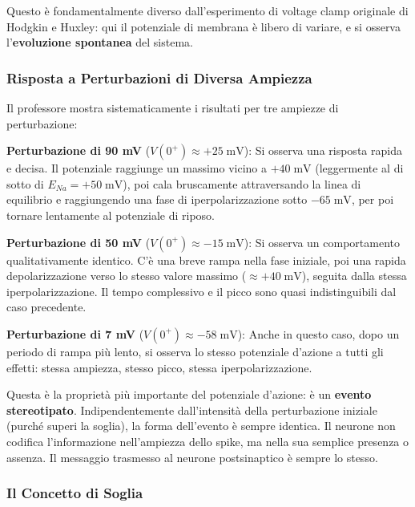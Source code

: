 Questo è fondamentalmente diverso dall'esperimento di voltage clamp originale di Hodgkin e Huxley: qui il potenziale di membrana è libero di variare, e si osserva l'\textbf{evoluzione spontanea} del sistema.

\subsubsection{Risposta a Perturbazioni di Diversa Ampiezza}

Il professore mostra sistematicamente i risultati per tre ampiezze di perturbazione:

\textbf{Perturbazione di 90 mV} ($V(0^+) \approx +25 \; \text{mV}$): Si osserva una risposta rapida e decisa. Il potenziale raggiunge un massimo vicino a $+40 \; \text{mV}$ (leggermente al di sotto di $E_{Na} = +50 \; \text{mV}$), poi cala bruscamente attraversando la linea di equilibrio e raggiungendo una fase di iperpolarizzazione sotto $-65 \; \text{mV}$, per poi tornare lentamente al potenziale di riposo.

\textbf{Perturbazione di 50 mV} ($V(0^+) \approx -15 \; \text{mV}$): Si osserva un comportamento qualitativamente identico. C'è una breve rampa nella fase iniziale, poi una rapida depolarizzazione verso lo stesso valore massimo ($\approx +40 \; \text{mV}$), seguita dalla stessa iperpolarizzazione. Il tempo complessivo e il picco sono quasi indistinguibili dal caso precedente.

\textbf{Perturbazione di 7 mV} ($V(0^+) \approx -58 \; \text{mV}$): Anche in questo caso, dopo un periodo di rampa più lento, si osserva lo stesso potenziale d'azione a tutti gli effetti: stessa ampiezza, stesso picco, stessa iperpolarizzazione.

\begin{tcolorbox}[colback=gray!5, colframe=gray!40, arc=2mm, boxrule=0.5pt]
Questa è la proprietà più importante del potenziale d'azione: è un \textbf{evento stereotipato}. Indipendentemente dall'intensità della perturbazione iniziale (purché superi la soglia), la forma dell'evento è sempre identica. Il neurone non codifica l'informazione nell'ampiezza dello spike, ma nella sua semplice presenza o assenza. Il messaggio trasmesso al neurone postsinaptico è sempre lo stesso.
\end{tcolorbox}

\subsubsection{Il Concetto di Soglia}

